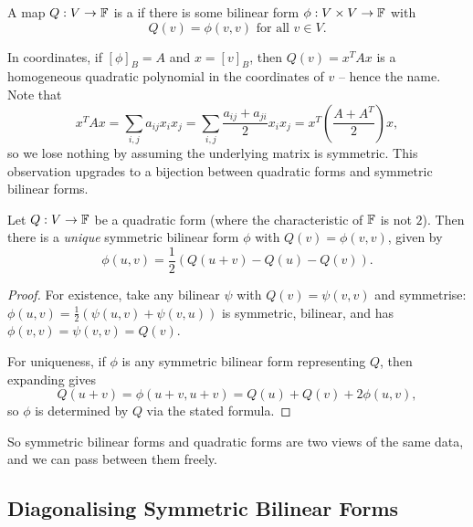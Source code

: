 \documentclass[a4paper]{scrartcl}
\begin{document}
\begin{definition}
    A map $Q: V \rightarrow \mathbb{F}$ is a  if there is some bilinear form $\phi: V \times V \rightarrow \mathbb{F}$ with
    $$
    Q(v) = \phi(v, v) \text{ for all } v \in V.
    $$
\end{definition}

In coordinates, if $[\phi]_B = A$ and $x = [v]_B$, then $Q(v) = x^T A x$ is a homogeneous quadratic polynomial in the coordinates of $v$ -- hence the name. Note that
$$
x^T A x = \sum_{i,j} a_{ij}x_i x_j = \sum_{i, j} \frac{a_{ij} + a_{ji}}{2} x_i x_j = x^T \left(\frac{A + A^T}{2}\right) x,
$$
so we lose nothing by assuming the underlying matrix is symmetric. This observation upgrades to a bijection between quadratic forms and symmetric bilinear forms.

\begin{proposition}
    Let $Q: V \rightarrow \mathbb{F}$ be a quadratic form (where the characteristic of $\mathbb{F}$ is not $2$). Then there is a \emph{unique} symmetric bilinear form $\phi$ with $Q(v) = \phi(v, v)$, given by
    $$
    \phi(u, v) = \frac{1}{2}\left(Q(u + v) - Q(u) - Q(v)\right).
    $$
\end{proposition}
\begin{proof}
    For existence, take any bilinear $\psi$ with $Q(v) = \psi(v,v)$ and symmetrise: $\phi(u, v) = \frac{1}{2}(\psi(u,v) + \psi(v, u))$ is symmetric, bilinear, and has $\phi(v,v) = \psi(v,v) = Q(v)$.

    For uniqueness, if $\phi$ is any symmetric bilinear form representing $Q$, then expanding gives
    $$
    Q(u + v) = \phi(u + v, u + v) = Q(u) + Q(v) + 2\phi(u, v),
    $$
    so $\phi$ is determined by $Q$ via the stated formula.
\end{proof}

So symmetric bilinear forms and quadratic forms are two views of the same data, and we can pass between them freely.

\subsection{Diagonalising Symmetric Bilinear Forms}
\end{document}
